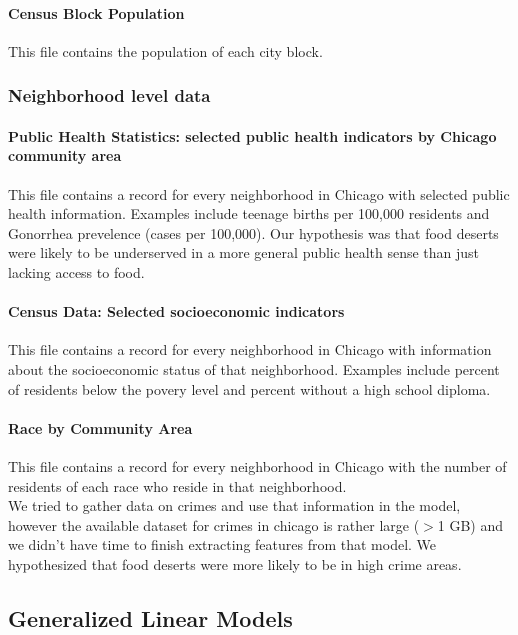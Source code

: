 \documentclass{report}
\begin{document}
\paragraph{ Census Block Population  }
This file contains the population of each city block. 

\subsubsection*{Neighborhood level data}

\paragraph{ Public Health Statistics: selected public health indicators by Chicago community area}
This file contains a record for every neighborhood in Chicago with selected public health information. Examples include teenage births per 100,000 residents and Gonorrhea prevelence (cases per 100,000). Our hypothesis was that food deserts were likely to be underserved in a more general public health sense than just lacking access to food. 

\paragraph{ Census Data: Selected socioeconomic indicators    }
This file contains a record for every neighborhood in Chicago with information about the socioeconomic status of that neighborhood. Examples include percent of residents below the povery level and percent without a high school diploma. 

\paragraph{ Race by Community Area }
This file contains a record for every neighborhood in Chicago with the number of residents of each race who reside in that neighborhood. \\

We tried to gather data on crimes and use that information in the model, however the available dataset for crimes in chicago is rather large ($>$1 GB) and we didn't have time to finish extracting features from that model. We hypothesized that food deserts were more likely to be in high crime areas. 

\subsection*{Generalized Linear Models}
\end{document}
